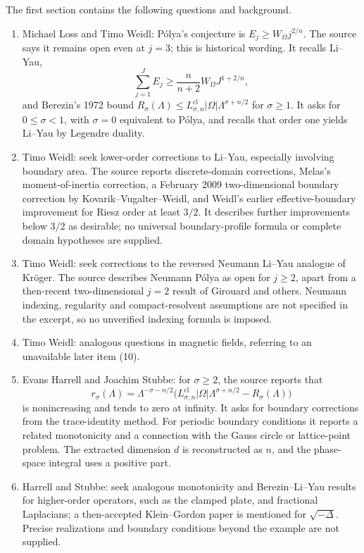 \documentclass[11pt]{article}
\begin{document}
The first section contains the following questions and background.
\begin{enumerate}
\item Michael Loss and Timo Weidl: P\'olya's conjecture is \(E_j\geq W_\Omega j^{2/n}\). The source says it remains open even at \(j=3\); this is historical wording. It recalls Li--Yau,
\[
 \sum_{j=1}^JE_j\geq\frac n{n+2}W_\Omega J^{1+2/n},
\]
and Berezin's 1972 bound \(R_\sigma(\Lambda)\leq L_{\sigma,n}^{\mathrm{cl}}|\Omega|\Lambda^{\sigma+n/2}\) for \(\sigma\geq1\). It asks for \(0\leq\sigma<1\), with \(\sigma=0\) equivalent to P\'olya, and recalls that order one yields Li--Yau by Legendre duality.
\item Timo Weidl: seek lower-order corrections to Li--Yau, especially involving boundary area. The source reports discrete-domain corrections, Melas's moment-of-inertia correction, a February 2009 two-dimensional boundary correction by Kovarik--Vugalter--Weidl, and Weidl's earlier effective-boundary improvement for Riesz order at least \(3/2\). It describes further improvements below \(3/2\) as desirable; no universal boundary-profile formula or complete domain hypotheses are supplied.
\item Timo Weidl: seek corrections to the reversed Neumann Li--Yau analogue of Kr\"oger. The source describes Neumann P\'olya as open for \(j\geq2\), apart from a then-recent two-dimensional \(j=2\) result of Girouard and others. Neumann indexing, regularity and compact-resolvent assumptions are not specified in the excerpt, so no unverified indexing formula is imposed.
\item Timo Weidl: analogous questions in magnetic fields, referring to an unavailable later item (10).
\item Evans Harrell and Joachim Stubbe: for \(\sigma\geq2\), the source reports that
\[
 r_\sigma(\Lambda)=\Lambda^{-\sigma-n/2}
 \bigl(L_{\sigma,n}^{\mathrm{cl}}|\Omega|\Lambda^{\sigma+n/2}-R_\sigma(\Lambda)\bigr)
\]
is nonincreasing and tends to zero at infinity. It asks for boundary corrections from the trace-identity method. For periodic boundary conditions it reports a related monotonicity and a connection with the Gauss circle or lattice-point problem. The extracted dimension \(d\) is reconstructed as \(n\), and the phase-space integral uses a positive part.
\item Harrell and Stubbe: seek analogous monotonicity and Berezin--Li--Yau results for higher-order operators, such as the clamped plate, and fractional Laplacians; a then-accepted Klein--Gordon paper is mentioned for \(\sqrt{-\Delta}\). Precise realizations and boundary conditions beyond the example are not supplied.

\end{enumerate}
\end{document}
